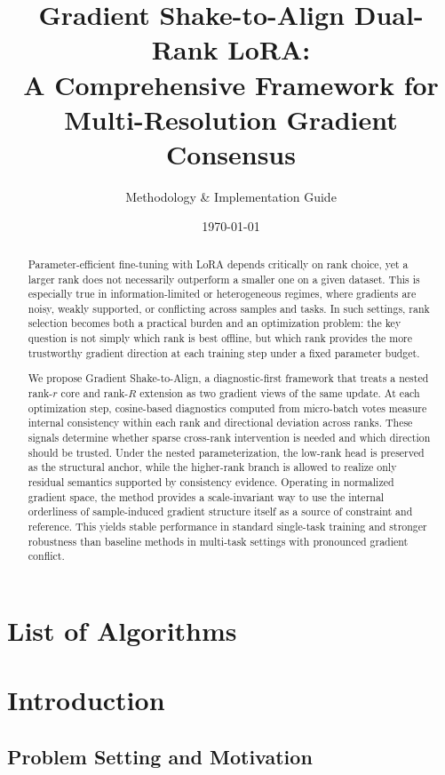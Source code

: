 \documentclass{article}
\title{\textbf{Gradient Shake-to-Align Dual-Rank LoRA: \\ A Comprehensive Framework for Multi-Resolution Gradient Consensus}}
\author{Methodology \& Implementation Guide}
\date{\today}
\makeatletter
\newcommand{\listofalgorithms}{%
  \section*{List of Algorithms}%
  \addcontentsline{toc}{section}{List of Algorithms}%
  \@starttoc{loa}%
}
\makeatother
\begin{document}
\maketitle


\begin{abstract}
Parameter-efficient fine-tuning with LoRA depends critically on rank choice, yet a larger rank does not necessarily outperform a smaller one on a given dataset. This is especially true in information-limited or heterogeneous regimes, where gradients are noisy, weakly supported, or conflicting across samples and tasks. In such settings, rank selection becomes both a practical burden and an optimization problem: the key question is not simply which rank is best offline, but which rank provides the more trustworthy gradient direction at each training step under a fixed parameter budget.

We propose Gradient Shake-to-Align, a diagnostic-first framework that treats a nested rank-$r$ core and rank-$R$ extension as two gradient views of the same update. At each optimization step, cosine-based diagnostics computed from micro-batch votes measure internal consistency within each rank and directional deviation across ranks. These signals determine whether sparse cross-rank intervention is needed and which direction should be trusted. Under the nested parameterization, the low-rank head is preserved as the structural anchor, while the higher-rank branch is allowed to realize only residual semantics supported by consistency evidence. Operating in normalized gradient space, the method provides a scale-invariant way to use the internal orderliness of sample-induced gradient structure itself as a source of constraint and reference. This yields stable performance in standard single-task training and stronger robustness than baseline methods in multi-task settings with pronounced gradient conflict.


\end{abstract}


\tableofcontents
\listoffigures
\listofalgorithms

\newpage
\section{Introduction}

\subsection{Problem Setting and Motivation}
\end{document}
